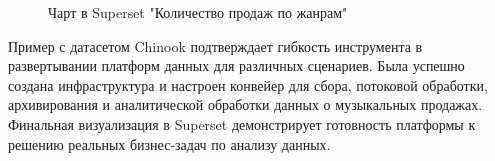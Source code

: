 \begin{enumerate}[1.]
\begin{itemize}
\begin{figure}[h]
                  \caption{Чарт в Superset "Количество продаж по жанрам"}
                  \label{fig:ex2_superset_chart}
                \end{figure}
                \FloatBarrier
        \end{itemize}
\end{enumerate}

Пример с датасетом Chinook подтверждает гибкость инструмента в развертывании платформ данных для различных сценариев. Была успешно создана инфраструктура и настроен конвейер для сбора, потоковой обработки, архивирования и аналитической обработки данных о музыкальных продажах. Финальная визуализация в Superset демонстрирует готовность платформы к решению реальных бизнес-задач по анализу данных.











%
